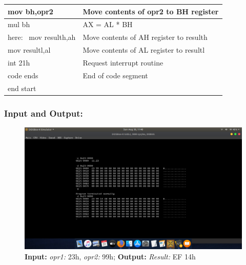 \documentclass[12pt,a4paper]{article}
\begin{document}
\begin{flushleft}
\begin{table}[htb]
{\begin{tabular}{|l|l|}
\hline
mov bh,opr2                                                      & Move contents of opr2 to BH register          \\ 
\hline
mul bh                                                           & AX = AL * BH                                  \\ 
\hline
here:~ mov resulth,ah                                            & Move contents of AH register to resulth       \\ 
\hline
mov resultl,al                                                   & Move contents of AL register to resultl       \\ 
\hline
int 21h                                                          & Request interrupt routine                     \\ 
\hline
code ends                                                        & End of code segment                           \\
\hline
end start                                                        &                                               \\
\hline
\end{tabular}
}
\end{table}

\newpage
\subsubsection*{\textbf{Input and Output:}}
\begin{figure}[h]
    \centering
    \includegraphics[trim = 100mm 70mm 100mm 80mm, clip, width = \textwidth]{Multiplication.png}
    \caption{ \textbf{Input:} \emph{opr1:} 23h, \emph{opr2:} 99h; 
              \textbf{Output:} \emph{Result:} EF 14h}
\end{figure}



\end{flushleft}
\end{document}

